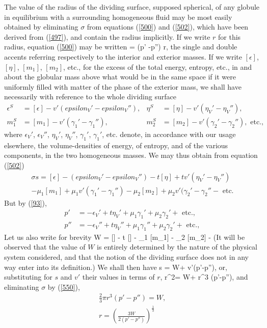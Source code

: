 \documentclass[12pt]{article}
\begin{document}
{The value of the radius of the dividing surface, supposed spherical, of any globule in equilibrium with a surrounding homogeneous fluid may be most easily obtained by eliminating $\sigma$ from equations (\ref{500}) and (\ref{502}), which have been derived from (\ref{497}), and contain the radius implicitly. If we write $r$ for this radius, equation (\ref{500}) may be written
\sigma = (p' -p'') r,   \label{550}\eqe
the single and double accents referring respectively to the interior and exterior masses. If we write $[\epsilon]$, $[\eta]$, $[m_1]$, $[m_2]$, etc., for the excess of the total energy, entropy, etc., in and about the globular mass above what would be in the same space if it were uniformly filled with matter of the phase of the exterior mass, we shall have necessarily with reference to the whole dividing surface
\begin{align*}
\epsilon^S&= [\epsilon] - v'(epsilon_V' - epsilon_V''), & \eta^S &= [\eta] - v'(\eta_V' - \eta_V''), \\
m_1^S &= [m_1] - v'(\gamma_1' - \gamma_1''), & m_2^S &= [m_2]- v'(\gamma_2' - \gamma_2''), \text{ etc.},\end{align*}
where $\epsilon_V'$, $\epsilon_V''$, $\eta_V'$, $\eta_V''$, $\gamma_1'$, $\gamma_1'$, etc. denote, in accordance with our usage elsewhere, the volume-densities of energy, of entropy, and of the various components, in the two homogeneous masses. We may thus obtain from equation (\ref{502})
\begin{multline}\sigma s = [\epsilon] -(epsilon_V' - epsilon_V'')- t[\eta] + tv'(\eta_V' - \eta_V'') \\
- \mu_1 [m_1] + \mu_1v'(\gamma_1' - \gamma_1'')- \mu_2[m_2] + \mu_2v'(\gamma_2' - \gamma_2''- \text{ etc.} \label{551} \end{multline}
But by (\ref{93}),
\begin{align*} 
p' &= - \epsilon_V' + t\eta_V' + \mu_1\gamma_1'+ \mu_2\gamma_2' + \text{ etc.}, \\
p'' &= - \epsilon_V'' + t\eta_V'' + \mu_1\gamma_1''+ \mu_2\gamma_2' + \text{ etc.},\end{align*}
Let us also write for brevity
\eqs W = [\epsilon] - t [\eta] - \mu_1 [m_1] - \mu_2 [m_2] -  \label{552}\eqe
(It will be observed that the value of $W$ is entirely determined by the nature of the physical system considered, and that the notion of the dividing surface does not in any way enter into its definition.) We shall then have
\eqs \sigma s = W+ v'(p'-p''),  \label{553}\eqe
or, substituting for $s$ and $v'$ their values in terms of $r$,
\pi r^2\sigma = W+ \pi r^3 (p'-p''),  \label{554}\eqe
and eliminating $\sigma$ by (\ref{550}),
\begin{gather}
\tfrac{2}{3}\pi r^3 (p'-p'')= W,    \label{555} \\
r= \left( \frac{3W}{2(p'-p'')}\right)^{\frac{1}{3}}   \label{556} \end{gather}

}
\end{document}
